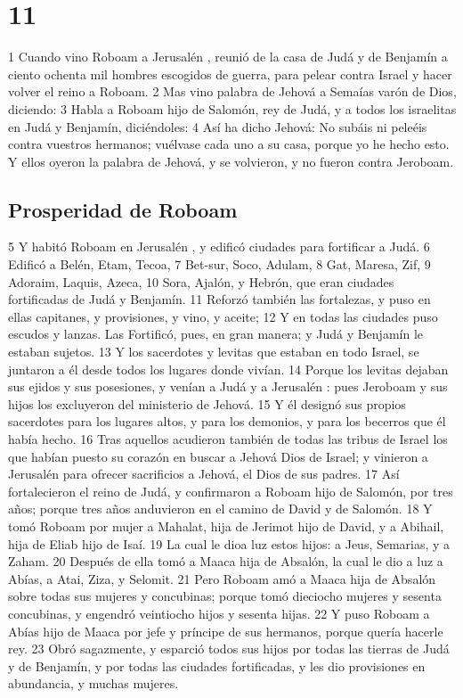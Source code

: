 \chapter{11}


1 Cuando vino Roboam a Jerusalén , reunió de la casa de Judá y de Benjamín a ciento  ochenta mil hombres escogidos de guerra, para pelear contra Israel y hacer volver el reino a Roboam.
2 Mas vino palabra de Jehová a Semaías varón de Dios, diciendo:
3 Habla a Roboam hijo de Salomón, rey de Judá, y a todos los israelitas en Judá y Benjamín, diciéndoles:
4 Así ha dicho Jehová: No subáis ni peleéis contra vuestros hermanos; vuélvase cada uno a su casa, porque yo he hecho esto. Y ellos oyeron la palabra de Jehová, y se volvieron, y no fueron contra Jeroboam.
\section*{Prosperidad de Roboam}

5 Y habitó Roboam en Jerusalén , y edificó ciudades para fortificar a Judá.
6 Edificó a Belén, Etam, Tecoa,
7 Bet-sur, Soco, Adulam,
8 Gat, Maresa, Zif,
9 Adoraim, Laquis, Azeca,
10 Sora, Ajalón, y  Hebrón, que eran ciudades fortificadas de Judá y Benjamín.
11 Reforzó también las fortalezas, y puso en ellas capitanes, y provisiones, y vino, y aceite;
12 Y en todas las ciudades puso escudos y lanzas. Las Fortificó, pues, en gran manera; y Judá y Benjamín le estaban sujetos.
13 Y los sacerdotes y levitas que estaban en todo Israel, se juntaron a él desde todos los lugares donde vivían.
14 Porque los levitas dejaban sus ejidos y sus posesiones, y venían a Judá y a Jerusalén : pues Jeroboam y sus hijos los excluyeron del ministerio de Jehová.
15 Y él designó sus propios sacerdotes para los lugares altos, y para los demonios, y para los becerros que él había hecho. 
16 Tras aquellos acudieron también de todas las tribus de Israel los que habían puesto su corazón en buscar a Jehová Dios de Israel; y vinieron a Jerusalén  para ofrecer sacrificios a Jehová, el Dios de sus padres.
17 Así fortalecieron el reino de Judá, y confirmaron a Roboam hijo de Salomón, por tres años; porque tres años anduvieron en el camino de David y de Salomón.
18 Y tomó Roboam por mujer a Mahalat, hija de Jerimot hijo de David, y a Abihail, hija de Eliab hijo de Isaí.
19 La cual le dioa luz estos hijos: a Jeus, Semarias, y a Zaham.
20 Después de ella tomó a Maaca hija de Absalón, la cual le dio a luz a Abías, a Atai, Ziza, y Selomit.
21 Pero Roboam amó a Maaca hija de Absalón sobre todas sus mujeres y concubinas; porque tomó dieciocho mujeres y sesenta concubinas, y engendró veintiocho hijos y sesenta hijas.
22 Y puso Roboam a Abías hijo de Maaca por jefe y príncipe de sus hermanos, porque quería hacerle rey.
23 Obró sagazmente, y esparció todos sus hijos por todas las tierras de Judá y de Benjamín, y por todas las ciudades fortificadas, y les dio provisiones en abundancia, y muchas mujeres.

